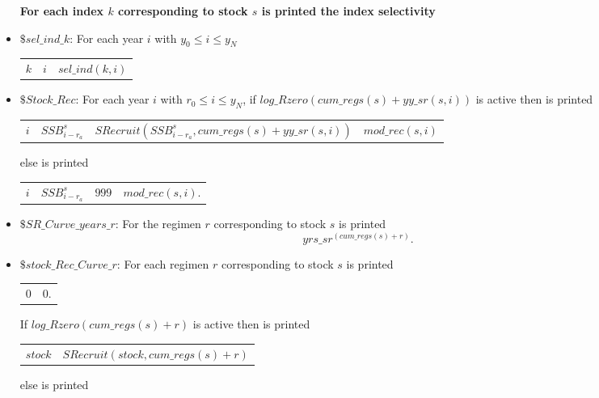 \documentclass{article}
\begin{document}
\begin{itemize}
\textbf{For each index $k$ corresponding to stock $s$ is printed the index selectivity}\\

\item $\$ sel\_ind\_k$: For each year $i$ with $y_0 \leq i \leq y_N$

\begin{center}
    \begin{tabular}{c c c}
        $k$ & $i$ & $sel\_ind(k,i)$ \\
          
    \end{tabular}
\end{center}

\item $\$ Stock\_Rec$: For each year $i$ with $r_0 \leq i \leq y_N$, if $log\_Rzero(cum\_regs(s)+yy\_sr(s,i))$ is active then is printed
\begin{center}
    \begin{tabular}{c c c c}
        $i$ &  $SSB^s_{i-r_a}$ & $SRecruit(SSB^s_{i-r_a},cum\_regs(s)+yy\_sr(s,i))$ & $mod\_rec(s,i)$\\
         
    \end{tabular}
    
\end{center}
else is printed
\begin{center}
    \begin{tabular}{c c c c}
     $i$    & $SSB^s_{i-r_a}$ & $999$ & $mod\_rec(s,i)$. \\

    \end{tabular}
\end{center}
\item $\$ SR\_Curve\_years\_r$: For the regimen $r$ corresponding to stock $s$ is printed
\begin{equation}
    yrs\_sr^{(cum\_regs(s)+r)}.
\end{equation}

\item $\$ stock\_Rec\_Curve\_r$: For each regimen $r$ corresponding to stock $s$ is printed
\begin{center}
    \begin{tabular}{c c}
        0 & 0. \end{tabular}
\end{center}
If $log\_Rzero(cum\_regs(s)+r)$ is active then is printed
\begin{center}
    \begin{tabular}{c c}
        $stock$ &  $SRecruit(stock, cum\_regs(s)+r)$ \end{tabular}
\end{center}
else is printed


\end{itemize}
\end{document}
